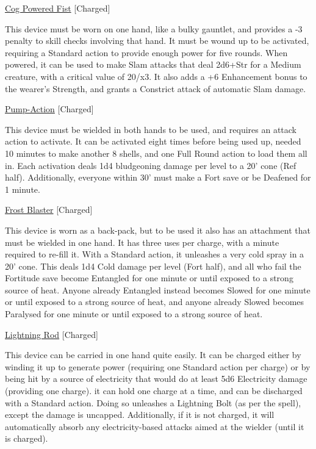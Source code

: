 \medskip\noindent\underline{Cog Powered Fist} [Charged]
 
\noindent This device must be worn on one hand, like a bulky gauntlet, and provides a -3 penalty to skill checks involving that hand. It must be wound up to be activated, requiring a Standard action to provide enough power for five rounds. When powered, it can be used to make Slam attacks that deal 2d6+Str for a Medium creature, with a critical value of 20/x3. It also adds a +6 Enhancement bonus to the wearer's Strength, and grants a Constrict attack of automatic Slam damage. 

\medskip\noindent\underline{Pump-Action} [Charged]
 
\noindent This device must be wielded in both hands to be used, and requires an attack action to activate. It can be activated eight times before being used up, needed 10 minutes to make another 8 shells, and one Full Round action to load them all in. Each activation deals 1d4 bludgeoning damage per level to a 20' cone (Ref half). Additionally, everyone within 30' must make a Fort save or be Deafened for 1 minute. 

\medskip\noindent\underline{Frost Blaster} [Charged] 

\noindent This device is worn as a back-pack, but to be used it also has an attachment that must be wielded in one hand. It has three uses per charge, with a minute required to re-fill it. With a Standard action, it unleashes a very cold spray in a 20' cone. This deals 1d4 Cold damage per level (Fort half), and all who fail the Fortitude save become Entangled for one minute or until exposed to a strong source of heat. Anyone already Entangled instead becomes Slowed for one minute or until exposed to a strong source of heat, and anyone already Slowed becomes Paralysed for one minute or until exposed to a strong source of heat. 

\medskip\noindent\underline{Lightning Rod} [Charged]
 
\noindent This device can be carried in one hand quite easily. It can be charged either by winding it up to generate power (requiring one Standard action per charge) or by being hit by a source of electricity that would do at least 5d6 Electricity damage (providing one charge). it can hold one charge at a time, and can be discharged with a Standard action. Doing so unleashes a Lightning Bolt (as per the spell), except the damage is uncapped. Additionally, if it is not charged, it will automatically absorb any electricity-based attacks aimed at the wielder (until it is charged). 


